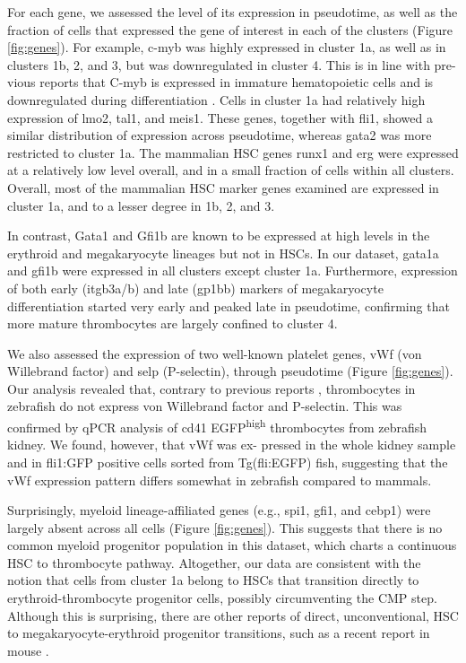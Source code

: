 For each gene, we assessed the level of its expression in pseudotime, as well as the fraction of cells that expressed the gene of interest in each of the clusters (Figure \ref{fig:genes}). For example, c-myb was highly expressed in cluster 1a, as well as in clusters 1b, 2, and 3, but was downregulated in cluster 4. This is in line with pre- vious reports that C-myb is expressed in immature hematopoietic cells and is downregulated during differentiation  \cite{Greig2008-ab}. Cells in cluster 1a had relatively high expression of lmo2, tal1, and meis1. These genes, together with fli1, showed a similar distribution of expression across pseudotime, whereas gata2 was more restricted to cluster 1a. The mammalian HSC genes runx1 and erg were expressed at a relatively low level overall, and in a small fraction of cells within all clusters. Overall, most of the mammalian HSC marker genes examined are expressed in cluster 1a, and to a lesser degree in 1b, 2, and 3.

In contrast, Gata1 and Gfi1b are known to be expressed at high levels in the erythroid and megakaryocyte lineages  \cite{Orkin2008-os, Vassen2007-ul} but not in HSCs. In our dataset, gata1a and gfi1b were expressed in all clusters except cluster 1a. Furthermore, expression of both early (itgb3a/b) and late (gp1bb) markers of megakaryocyte differentiation started very early and peaked late in pseudotime, confirming that more mature thrombocytes are largely confined to cluster 4.

We also assessed the expression of two well-known platelet genes, vWf (von Willebrand factor) and selp (P-selectin), through pseudotime (Figure \ref{fig:genes}). Our analysis revealed that, contrary to previous reports  \cite{Carrillo2010-gy}, thrombocytes in zebrafish do not express von Willebrand factor and P-selectin. This was confirmed by qPCR analysis of cd41 EGFP\textsuperscript{high} thrombocytes from zebrafish kidney. We found, however, that vWf was ex- pressed in the whole kidney sample and in fli1:GFP positive cells sorted from Tg(fli:EGFP) fish, suggesting that the vWf expression pattern differs somewhat in zebrafish compared to mammals.

Surprisingly, myeloid lineage-affiliated genes (e.g., spi1, gfi1, and cebp1) were largely absent across all cells (Figure \ref{fig:genes}). This suggests that there is no common myeloid progenitor population in this dataset, which charts a continuous HSC to thrombocyte pathway. Altogether, our data are consistent with the notion that cells from cluster 1a belong to HSCs that transition directly to erythroid-thrombocyte progenitor cells, possibly circumventing the CMP step. Although this is surprising, there are other reports of direct, unconventional, HSC to megakaryocyte-erythroid progenitor transitions, such as a recent report in mouse \cite{Guo2013-si}.

